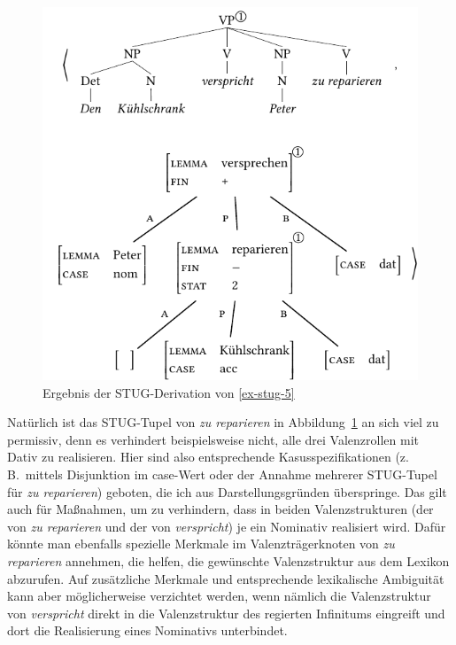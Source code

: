 \begin{figure}[t]
\centering
\includegraphics{graphics/abb98.pdf}
\caption{\label{fig-stug-8}Ergebnis der STUG-Derivation von \ref{ex-stug-5}}
\end{figure}

Natürlich ist das STUG-Tupel von {\it zu reparieren} in Abbildung~\ref{fig-stug-8} an sich viel zu permissiv, denn es verhindert beispielsweise nicht, alle drei Valenzrollen mit Dativ zu realisieren. Hier sind also entsprechende Kasusspezifikationen (z.\,B.\ mittels Disjunktion im {\sc case}-Wert oder der Annahme mehrerer STUG-Tupel für {\it zu reparieren}) geboten, die ich aus Darstellungsgründen überspringe. Das gilt auch für Ma\ss nahmen, um zu verhindern, dass in beiden Valenzstrukturen (der von \textit{zu reparieren} und der von \textit{verspricht}) je ein Nominativ realisiert wird. Dafür könnte man ebenfalls spezielle Merkmale im Valenzträgerknoten von \textit{zu reparieren} annehmen, die helfen, die gewünschte Valenzstruktur aus dem Lexikon abzurufen. Auf zusätzliche Merkmale und entsprechende lexikalische Ambiguität kann aber möglicherweise verzichtet werden, wenn nämlich die Valenzstruktur von \textit{verspricht} direkt in die Valenzstruktur des regierten Infinitums eingreift und dort die Realisierung eines Nominativs unterbindet.   


